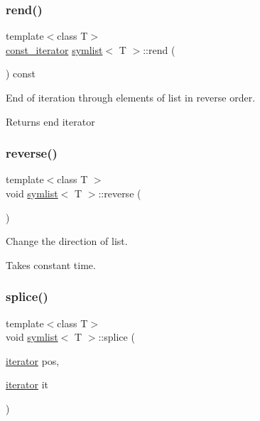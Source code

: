 \subsubsection{\texorpdfstring{rend()}{rend()}\hspace{0.1cm}{\footnotesize\ttfamily [2/2]}}
{\footnotesize\ttfamily template$<$class T$>$ \\
\mbox{\hyperlink{structsymlist__iterator}{const\+\_\+iterator}} \mbox{\hyperlink{classsymlist}{symlist}}$<$ T $>$\+::rend (\begin{DoxyParamCaption}{ }\end{DoxyParamCaption}) const\hspace{0.3cm}{\ttfamily [inline]}}



End of iteration through elements of list in reverse order. 

\begin{DoxyReturn}{Returns}
end iterator 
\end{DoxyReturn}
\mbox{\label{classsymlist_ae22b65101604c694e96974cc9579ab78}} 
\subsubsection{\texorpdfstring{reverse()}{reverse()}}
{\footnotesize\ttfamily template$<$class T $>$ \\
void \mbox{\hyperlink{classsymlist}{symlist}}$<$ T $>$\+::reverse (\begin{DoxyParamCaption}{ }\end{DoxyParamCaption})\hspace{0.3cm}{\ttfamily [inline]}}



Change the direction of list. 

Takes constant time. \mbox{\label{classsymlist_ac2bd4d9db62ea6a3282662c62a97c3b2}} 
\subsubsection{\texorpdfstring{splice()}{splice()}\hspace{0.1cm}{\footnotesize\ttfamily [1/2]}}
{\footnotesize\ttfamily template$<$class T$>$ \\
void \mbox{\hyperlink{classsymlist}{symlist}}$<$ T $>$\+::splice (\begin{DoxyParamCaption}\item[{\mbox{\hyperlink{structsymlist__iterator}{iterator}}}]{pos,  }\item[{\mbox{\hyperlink{structsymlist__iterator}{iterator}}}]{it }\end{DoxyParamCaption})}



